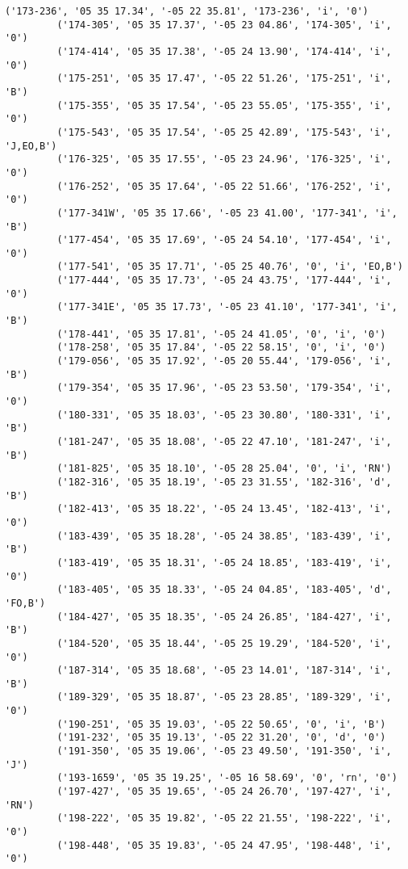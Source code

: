 \documentclass{article}
\begin{document}
\begin{Verbatim}[commandchars=\\\{\}]
         ('173-236', '05 35 17.34', '-05 22 35.81', '173-236', 'i', '0')
         ('174-305', '05 35 17.37', '-05 23 04.86', '174-305', 'i', '0')
         ('174-414', '05 35 17.38', '-05 24 13.90', '174-414', 'i', '0')
         ('175-251', '05 35 17.47', '-05 22 51.26', '175-251', 'i', 'B')
         ('175-355', '05 35 17.54', '-05 23 55.05', '175-355', 'i', '0')
         ('175-543', '05 35 17.54', '-05 25 42.89', '175-543', 'i', 'J,EO,B')
         ('176-325', '05 35 17.55', '-05 23 24.96', '176-325', 'i', '0')
         ('176-252', '05 35 17.64', '-05 22 51.66', '176-252', 'i', '0')
         ('177-341W', '05 35 17.66', '-05 23 41.00', '177-341', 'i', 'B')
         ('177-454', '05 35 17.69', '-05 24 54.10', '177-454', 'i', '0')
         ('177-541', '05 35 17.71', '-05 25 40.76', '0', 'i', 'EO,B')
         ('177-444', '05 35 17.73', '-05 24 43.75', '177-444', 'i', '0')
         ('177-341E', '05 35 17.73', '-05 23 41.10', '177-341', 'i', 'B')
         ('178-441', '05 35 17.81', '-05 24 41.05', '0', 'i', '0')
         ('178-258', '05 35 17.84', '-05 22 58.15', '0', 'i', '0')
         ('179-056', '05 35 17.92', '-05 20 55.44', '179-056', 'i', 'B')
         ('179-354', '05 35 17.96', '-05 23 53.50', '179-354', 'i', '0')
         ('180-331', '05 35 18.03', '-05 23 30.80', '180-331', 'i', 'B')
         ('181-247', '05 35 18.08', '-05 22 47.10', '181-247', 'i', 'B')
         ('181-825', '05 35 18.10', '-05 28 25.04', '0', 'i', 'RN')
         ('182-316', '05 35 18.19', '-05 23 31.55', '182-316', 'd', 'B')
         ('182-413', '05 35 18.22', '-05 24 13.45', '182-413', 'i', '0')
         ('183-439', '05 35 18.28', '-05 24 38.85', '183-439', 'i', 'B')
         ('183-419', '05 35 18.31', '-05 24 18.85', '183-419', 'i', '0')
         ('183-405', '05 35 18.33', '-05 24 04.85', '183-405', 'd', 'FO,B')
         ('184-427', '05 35 18.35', '-05 24 26.85', '184-427', 'i', 'B')
         ('184-520', '05 35 18.44', '-05 25 19.29', '184-520', 'i', '0')
         ('187-314', '05 35 18.68', '-05 23 14.01', '187-314', 'i', 'B')
         ('189-329', '05 35 18.87', '-05 23 28.85', '189-329', 'i', '0')
         ('190-251', '05 35 19.03', '-05 22 50.65', '0', 'i', 'B')
         ('191-232', '05 35 19.13', '-05 22 31.20', '0', 'd', '0')
         ('191-350', '05 35 19.06', '-05 23 49.50', '191-350', 'i', 'J')
         ('193-1659', '05 35 19.25', '-05 16 58.69', '0', 'rn', '0')
         ('197-427', '05 35 19.65', '-05 24 26.70', '197-427', 'i', 'RN')
         ('198-222', '05 35 19.82', '-05 22 21.55', '198-222', 'i', '0')
         ('198-448', '05 35 19.83', '-05 24 47.95', '198-448', 'i', '0')

\end{Verbatim}
\end{document}
